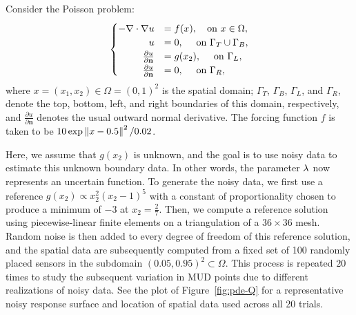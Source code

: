 Consider the Poisson problem:
\begin{equation}\label{eq:pde-equation}
\begin{cases}
\hfill -\nabla \cdot \nabla u &= f(x), \quad\text{on } x\in \Omega, \\
\hfill u &= 0, \quad\text{ on } \Gamma_T \cup \Gamma_B, \\
\hfill \frac{\partial u}{\partial \mathbf{n}} &= g(x_2), \quad\text{ on } \Gamma_L, \\
\hfill \frac{\partial u}{\partial \mathbf{n}} &= 0, \quad\text{ on } \Gamma_R,
\end{cases}
\end{equation}
where $x=(x_1, x_2) \in \Omega = (0,1)^2$ is the spatial domain; $\Gamma_T$, $\Gamma_B$, $\Gamma_L$, and $\Gamma_R$, denote the top, bottom, left, and right boundaries of this domain, respectively, and $\frac{\partial u}{\partial \mathbf{n}}$ denotes the usual outward normal derivative.
The forcing function $f$ is taken to be $10\exp{\left\Vert x - 0.5\right\Vert^2 / 0.02}$.

Here, we assume that $g(x_2)$ is unknown, and the goal is to use noisy data to estimate this unknown boundary data.
In other words, the parameter $\lambda$ now represents an uncertain function.
To generate the noisy data, we first use a reference $g(x_2)\propto x_2^2(x_2-1)^5$ with a constant of proportionality chosen to produce a minimum of $-3$ at $x_2=\frac{2}{7}$.
Then, we compute a reference solution using piecewise-linear finite elements on a triangulation of a $36\times36$ mesh.
Random noise is then added to every degree of freedom of this reference solution, and the spatial data are subsequently computed from a fixed set of 100 randomly placed sensors in the subdomain $(0.05, 0.95)^2 \subset \Omega$.
This process is repeated $20$ times to study the subsequent variation in MUD points due to different realizations of noisy data.
See the plot of Figure~\ref{fig:pde-Q} for a representative noisy response surface and location of spatial data used across all 20 trials.

